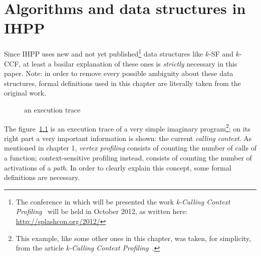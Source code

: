 \documentclass[a4paper,10pt]{report}
\begin{document}
\chapter{Algorithms and data structures in IHPP}
Since IHPP uses new and not yet published\footnote{The conference in which will be presented the work \emph{k-Calling Context
Profiling}~\cite{kccf} will be held in October 2012, as written here:
\mbox{\url{http://splashcon.org/2012/}}} data structures like $k$-SF and $k$-CCF, at least a basilar explanation of these ones is \emph{strictly} necessary in this paper. 
Note: in order to remove every possible ambiguity about these data structures, 
formal definitions used in this chapter are literally taken from the original work.

\begin{figure}
\begin{center}


\caption{an execution trace}
\label{callex1}
\end{center}
\end{figure}
The figure~\ref{callex1} is an execution trace of a very simple imaginary program\footnote{This example, like some other ones in this chapter, was taken, for simplicity, from the article \emph{k-Calling Context Profiling}~\cite{kccf}.}; on its right part a very important information is shown: the current \emph{calling context}. 
As mentioned in chapter 1, \emph{vertex profiling} consists of counting the number of calls of a function; context-sensitive profiling instead, consists of counting the number of activations of a \emph{path}. In order to clearly explain this concept, some formal definitions are necessary.
\end{document}
